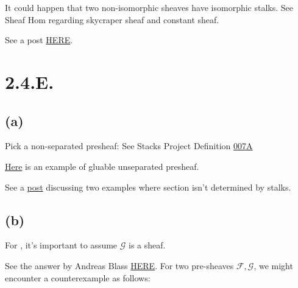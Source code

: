 It could happen that two non-isomorphic sheaves have isomorphic stalks. See Sheaf Hom  regarding skycraper sheaf and constant sheaf. 

See a post \href{https://math.stackexchange.com/questions/43314/failure-of-isomorphisms-on-stalks-to-arise-from-an-isomorphism-of-sheaves}{HERE}.

\section{2.4.E.}

\subsection{(a)}

Pick a non-separated presheaf: See Stacks Project Definition \href{https://stacks.math.columbia.edu/tag/0078}{007A} 

\href{https://www.google.com/url?sa=t&rct=j&q=&esrc=s&source=web&cd=&cad=rja&uact=8&ved=2ahUKEwit-uamm8WEAxUoHTQIHf3_AbwQFnoECA4QAw&url=https%3A%2F%2Fmath.stackexchange.com%2Fquestions%2F1904223%2Fexample-of-a-gluable-unseparated-presheaf%23%3A~%3Atext%3DSuppose%2520Y%2520admits%2520a%2520non%2Cequal%252C%2520but%2520not%2520globally%2520equal.&usg=AOvVaw1IZBw2qkgpiNTBtY1d9HpB&opi=89978449}{Here} is an example of gluable unseparated presheaf.

See a \href{https://math.stackexchange.com/questions/323466/example-of-a-section-s-of-a-presheaf-mathcalf-which-is-not-determined-by}{post} discussing two examples where section isn't determined by stalks.

\subsection{(b)}

For , it's important to assume $\mathscr G$ is a sheaf. 

See the answer by Andreas Blass \href{https://math.stackexchange.com/questions/323466/example-of-a-section-s-of-a-presheaf-mathcalf-which-is-not-determined-by}{HERE}.
For two pre-sheaves $\mathscr F,\mathscr G$, we might encounter a counterexample as follows:

